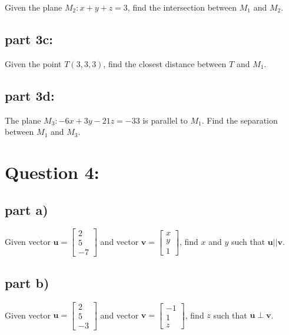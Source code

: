 \documentclass{article}
\newcommand{\colvec}[3]{\begin{bmatrix} #1 \\ #2 \\ #3 \end{bmatrix}}
\begin{document}
Given the plane \(M_2: x + y + z = 3\), find the intersection between \(M_1\) and \(M_2\).

\subsection*{part 3c:}

Given the point \(T(3,3,3)\), find the closest distance between \(T\) and \(M_1\). 

\subsection*{part 3d:} 

The plane \(M_3: -6x + 3y - 21z = -33\) is parallel to \(M_1\). Find the separation between \(M_1\) and \(M_3\). 



\section*{Question 4:}

\subsection*{part a)}

Given vector \(\mathbf{u} = \colvec{2}{5}{-7}\) and vector \(\mathbf{v} = \colvec{x}{y}{1}\), find \(x\) and \(y\) such that \(\mathbf{u} || \mathbf{v}\).

\subsection*{part b)}

Given vector \(\mathbf{u} = \colvec{2}{5}{-3}\) and vector \(\mathbf{v} = \colvec{-1}{1}{z}\), find \(z\) such that \(\mathbf{u} \perp \mathbf{v}\).
\end{document}
